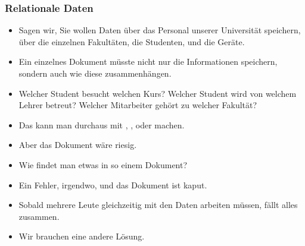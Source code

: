 \documentclass[aspectratio=169,mathserif,notheorems]{beamer}%
\begin{document}
\begin{frame}[t]%
\frametitle{Relationale Daten}%
\begin{itemize}%
\item Sagen wir, Sie wollen Daten über das Personal unserer Universität speichern, über die einzelnen Fakultäten, die Studenten, und die Geräte.%
\item<3-> Ein einzelnes Dokument müsste nicht nur die Informationen speichern, sondern auch wie diese zusammenhängen.%
\item<4-> Welcher Student besucht welchen Kurs? Welcher Student wird von welchem Lehrer betreut? Welcher Mitarbeiter gehört zu welcher Fakultät?%
\item<5-> Das kann man durchaus mit , , oder  machen.%
\item<6-> Aber das Dokument wäre riesig.%
\item<7-> Wie findet man etwas in so einem Dokument?%
\item<8-> Ein Fehler, irgendwo, und das Dokument ist kaput.%
\item<9-> Sobald mehrere Leute gleichzeitig mit den Daten arbeiten müssen, fällt alles zusammen.%
\item<10-> Wir brauchen eine andere Lösung.%
\end{itemize}%
%
\end{frame}%
%
\end{document}
